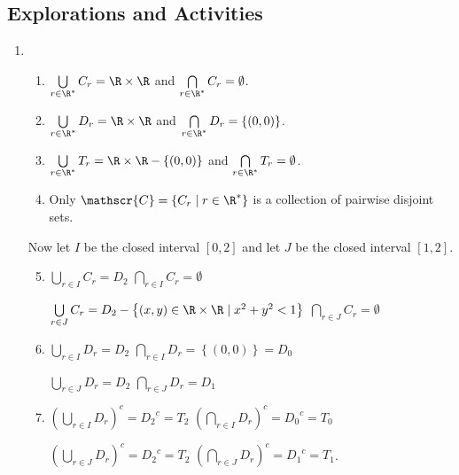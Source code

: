 \subsection*{Explorations and Activities}
\setcounter{oldenumi}{\theenumi}
\begin{enumerate} \setcounter{enumi}{\theoldenumi}
\item \begin{enumerate}
\item $\bigcup\limits_{r \in \R^*}^{}C_r = \R \times \R$ \quad and \quad 
$\bigcap\limits_{r \in \R^*}^{}C_r = \emptyset$.

\item $\bigcup\limits_{r \in \R^*}^{}D_r = \R \times \R$ \quad and \quad 
$\bigcap\limits_{r \in \R^*}^{}D_r = \left\{ \left( 0, 0 \right) \right\}$.

\item $\bigcup\limits_{r \in \R^*}^{}T_r = \R \times \R - \left\{ \left( 0, 0 \right) \right\}$ \quad and \quad 
$\bigcap\limits_{r \in \R^*}^{}T_r = \emptyset$.

\item Only $\mathscr{C} = \left\{ C_r \mid r \in \R^* \right\}$ is a collection of pairwise disjoint sets.
\end{enumerate}

\noindent
Now let $I$ be the closed interval $[0, 2]$ and let $J$ be the closed interval $[1, 2]$.

\begin{enumerate} \setcounter{enumii}{4}
\item $\bigcup\limits_{r \in I}^{}C_r = D_2$ \qquad $\bigcap\limits_{r \in I}^{}C_r = \emptyset$

$\bigcup\limits_{r \in J}^{}C_r = D_2 - \left\{ (x, y) \in \R \times \R \mid x^2 + y^2 < 1 \right\}$ \qquad $\bigcap\limits_{r \in J}^{}C_r = \emptyset$

\item $\bigcup\limits_{r \in I}^{}D_r = D_2$ \qquad 
$\bigcap\limits_{r \in I}^{}D_r = \left\{ \left( 0, 0 \right) \right\} = D_0$

$\bigcup\limits_{r \in J}^{}D_r = D_2$ \qquad $\bigcap\limits_{r \in J}^{}D_r = D_1$


\item $\left( \bigcup\limits_{r \in I}^{}D_r \right)^c = {D_2}^c = T_2$ \qquad 
$\left( \bigcap\limits_{r \in I}^{}D_r \right)^c = {D_0}^c = T_0$
 
$\left( \bigcup\limits_{r \in J}^{}D_r \right)^c = {D_2}^c = T_2$ \qquad 
$\left( \bigcap\limits_{r \in J}^{}D_r \right)^c = {D_1}^c = T_1$.



\end{enumerate}
\end{enumerate}
